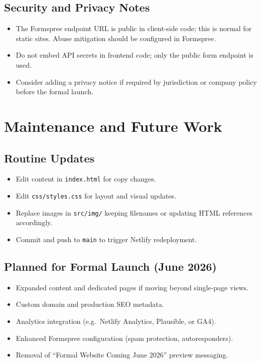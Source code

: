 \documentclass[11pt,a4paper]{article}
\begin{document}
\subsection{Security and Privacy Notes}

\begin{itemize}[noitemsep]
  \item The Formspree endpoint URL is public in client-side code; this is normal
        for static sites. Abuse mitigation should be configured in Formspree.
  \item Do not embed API secrets in frontend code; only the public form endpoint
        is used.
  \item Consider adding a privacy notice if required by jurisdiction or company
        policy before the formal launch.
\end{itemize}

\section{Maintenance and Future Work}

\subsection{Routine Updates}

\begin{itemize}[noitemsep]
  \item Edit content in \texttt{index.html} for copy changes.
  \item Edit \texttt{css/styles.css} for layout and visual updates.
  \item Replace images in \texttt{src/img/} keeping filenames or updating HTML
        references accordingly.
  \item Commit and push to \texttt{main} to trigger Netlify redeployment.
\end{itemize}

\subsection{Planned for Formal Launch (June 2026)}

\begin{itemize}[noitemsep]
  \item Expanded content and dedicated pages if moving beyond single-page views.
  \item Custom domain and production SEO metadata.
  \item Analytics integration (e.g.\ Netlify Analytics, Plausible, or GA4).
  \item Enhanced Formspree configuration (spam protection, autoresponders).
  \item Removal of ``Formal Website Coming June 2026'' preview messaging.
\end{itemize}
\end{document}
